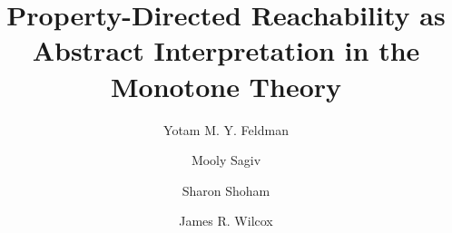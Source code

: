 \documentclass[acmsmall,screen]{acmart}
\begin{document}
%
\newif\ifcomments
%
\commentsfalse
\nochangebars
{}

%
%
\newcommand{\sharonnew}[1]{\sharon{#1}}
\newcommand{\yotamnew}[1]{\yotamsmall{#1}}
\newcommand{\yotamforlater}[1]{}

\ifcomments
%
%
%
\newcommand{\artem}[1]{{\footnotesize\color{olive}[{\bf Artem}: #1]}}
\newcommand{\yotamsmall}[1]{{\footnotesize\color{magenta}[{\bf Yotam}: #1]}}

\newcommand{\sharon}[1]{{\textcolor{purple}{SS: {\em #1}}}}
\newcommand{\mooly}[1]{{\textcolor{cyan}{MS: {\em #1}}}}
\newcommand{\yotam}[1]{{\textcolor{magenta}{{\bf #1}}}}
\newcommand{\jrw}[1]{{\textcolor{green}{JRW: {\em #1}}}}
\newcommand{\TODO}[1]{{\textcolor{red}{TODO: {\em #1}}}}

\else
\newcommand{\sharon}[1]{}
\newcommand{\adam}[1]{}
\newcommand{\mooly}[1]{}
\newcommand{\neil}[1]{}
\newcommand{\jrw}[1]{}
\newcommand{\yotam}[1]{}
\newcommand{\TODO}[1]{}
\newcommand{\artem}[1]{}
\newcommand{\yotamsmall}[1]{}


\fi

\newcommand{\commentout}[1]{}
\newcommand{\OMIT}[1]{}  
%
%
\title{Property-Directed Reachability as Abstract Interpretation in the Monotone Theory}

%
%
%
%
%
%
%
%
%
%
%


%
%
%
%
%
%
%
%
%

%

\author{Yotam M. Y. Feldman}


\author{Mooly Sagiv}

\author{Sharon Shoham}

\author{James R. Wilcox}
\end{document}
